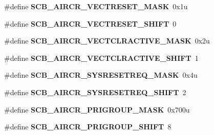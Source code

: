 \begin{DoxyCompactItemize}
\item 
\hypertarget{group___s_c_b___register___masks_gac4c28207a4bc452bd147dd820037eb08}{}\#define {\bfseries S\+C\+B\+\_\+\+A\+I\+R\+C\+R\+\_\+\+V\+E\+C\+T\+R\+E\+S\+E\+T\+\_\+\+M\+A\+S\+K}~0x1u\label{group___s_c_b___register___masks_gac4c28207a4bc452bd147dd820037eb08}

\item 
\hypertarget{group___s_c_b___register___masks_ga55414e87d5441a65f2ddc8039a9472aa}{}\#define {\bfseries S\+C\+B\+\_\+\+A\+I\+R\+C\+R\+\_\+\+V\+E\+C\+T\+R\+E\+S\+E\+T\+\_\+\+S\+H\+I\+F\+T}~0\label{group___s_c_b___register___masks_ga55414e87d5441a65f2ddc8039a9472aa}

\item 
\hypertarget{group___s_c_b___register___masks_ga185d1b709217248a97734877cf639eac}{}\#define {\bfseries S\+C\+B\+\_\+\+A\+I\+R\+C\+R\+\_\+\+V\+E\+C\+T\+C\+L\+R\+A\+C\+T\+I\+V\+E\+\_\+\+M\+A\+S\+K}~0x2u\label{group___s_c_b___register___masks_ga185d1b709217248a97734877cf639eac}

\item 
\hypertarget{group___s_c_b___register___masks_gacc6a889c36f0c9d996ab29dc076eec6e}{}\#define {\bfseries S\+C\+B\+\_\+\+A\+I\+R\+C\+R\+\_\+\+V\+E\+C\+T\+C\+L\+R\+A\+C\+T\+I\+V\+E\+\_\+\+S\+H\+I\+F\+T}~1\label{group___s_c_b___register___masks_gacc6a889c36f0c9d996ab29dc076eec6e}

\item 
\hypertarget{group___s_c_b___register___masks_gab69a066f25df4f52635379ca69f99b35}{}\#define {\bfseries S\+C\+B\+\_\+\+A\+I\+R\+C\+R\+\_\+\+S\+Y\+S\+R\+E\+S\+E\+T\+R\+E\+Q\+\_\+\+M\+A\+S\+K}~0x4u\label{group___s_c_b___register___masks_gab69a066f25df4f52635379ca69f99b35}

\item 
\hypertarget{group___s_c_b___register___masks_ga858136a0c46c0a91e00af704cb3e2eb8}{}\#define {\bfseries S\+C\+B\+\_\+\+A\+I\+R\+C\+R\+\_\+\+S\+Y\+S\+R\+E\+S\+E\+T\+R\+E\+Q\+\_\+\+S\+H\+I\+F\+T}~2\label{group___s_c_b___register___masks_ga858136a0c46c0a91e00af704cb3e2eb8}

\item 
\hypertarget{group___s_c_b___register___masks_ga4fda9c879425b15aae24d451ad3ba208}{}\#define {\bfseries S\+C\+B\+\_\+\+A\+I\+R\+C\+R\+\_\+\+P\+R\+I\+G\+R\+O\+U\+P\+\_\+\+M\+A\+S\+K}~0x700u\label{group___s_c_b___register___masks_ga4fda9c879425b15aae24d451ad3ba208}

\item 
\hypertarget{group___s_c_b___register___masks_ga9dc62ab5e1be9158658945f9887a9550}{}\#define {\bfseries S\+C\+B\+\_\+\+A\+I\+R\+C\+R\+\_\+\+P\+R\+I\+G\+R\+O\+U\+P\+\_\+\+S\+H\+I\+F\+T}~8\label{group___s_c_b___register___masks_ga9dc62ab5e1be9158658945f9887a9550}


\end{DoxyCompactItemize}
